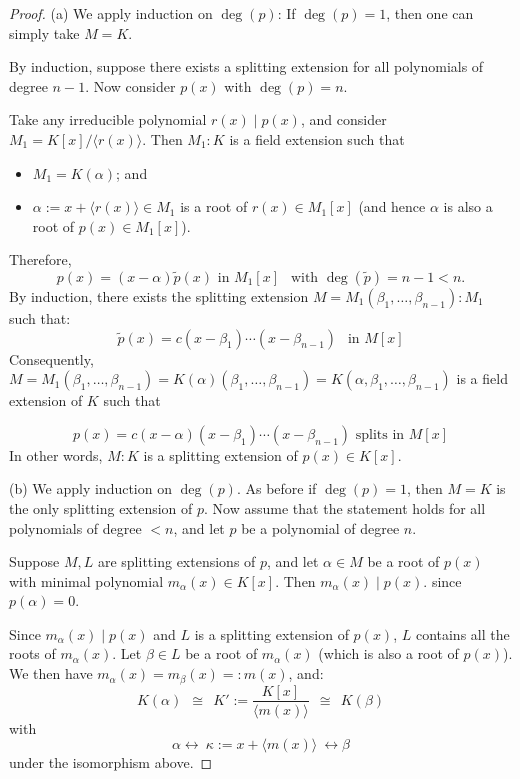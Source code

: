 \begin{proof}
(a) We apply induction on $\deg(p)$: If $\deg(p) = 1$, then one can simply take $M = K$.

By induction, suppose there exists a splitting extension for all polynomials of degree $n-1$. Now consider $p(x)$ with $\deg(p) = n$.

Take any irreducible polynomial $r(x) \mid p(x)$, and consider $M_1 = K[x] / \langle r(x) \rangle$. Then $M_1 : K$ is 
a field extension such that 
\begin{itemize}
    \item $M_1 = K(\alpha)$; and
    \item $\alpha := x + \langle r(x) \rangle \in M_1$ is a root of $r(x) \in M_1[x]$ (and hence $\alpha$ is also a root of $p(x) \in M_1[x]$).
\end{itemize}
Therefore,
    \[
    p(x) = (x-\alpha)\widetilde{p}(x) \text{ in } M_1[x]\ \ \text{ with } \deg(\widetilde{p}) = n-1 < n.
    \]
By induction, there exists the splitting extension $M = M_1(\beta_1, \dots, \beta_{n-1}) : M_1$ such that:
    \[
    \widetilde{p}(x) = c(x - \beta_1) \cdots (x - \beta_{n-1})\ \ \text{ in } M[x]
    \]
Consequently, $M = M_1(\beta_1, \dots, \beta_{n-1}) = K(\alpha)(\beta_1, \dots, \beta_{n-1}) = K(\alpha, \beta_1, \dots, \beta_{n-1})$ is a field extension of $K$ such that

\[p(x) = c(x - \alpha)(x - \beta_1) \cdots (x - \beta_{n-1}) \text{ splits in } M[x]
    \]
In other words, $M:K$ is a splitting extension of $p(x) \in K[x]$.

\vspace{3mm}
\noindent (b) We apply induction on $\deg(p)$. As before if $\deg(p) = 1$, then $M = K$ is the only splitting extension of $p$. Now assume that the statement holds for all polynomials of degree $< n$, and let $p$ be a polynomial of degree $n$.

Suppose $M, L$ are splitting extensions of $p$, and let $\alpha \in M$ be a root of $p(x)$ with minimal polynomial $m_\alpha(x) \in K[x]$. Then  $m_\alpha(x) \mid p(x)$.
since $p(\alpha) = 0$. 

Since $m_{\alpha}(x) \mid p(x)$ and $L$ is a splitting extension of $p(x)$, $L$ contains all the roots of $m_{\alpha}(x)$. Let $\beta \in L$ be a root of $m_\alpha(x)$ (which is also a root of $p(x)$). We then have $m_\alpha(x) = m_{\beta}(x) =: m(x)$, and:
    \[
    K(\alpha)\ \ \cong\ \ K':=\frac{K[x]}{\langle m(x) \rangle}\ \ \cong\ \  K(\beta) 
    \]
with 
\[\alpha \longleftrightarrow\ \kappa:= x + \langle m(x) \rangle\ \longleftrightarrow \beta\]
under the isomorphism above.


\end{proof}
